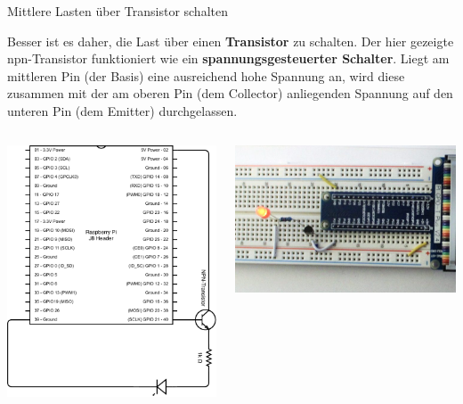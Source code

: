 {
\footnotesize

\begin{frame}{Mittlere Lasten über Transistor schalten}
    \parbox{\linewidth}{
        Besser ist es daher, die Last über einen \textbf{Transistor} zu schalten. Der hier
        gezeigte \glqq{}npn-Transistor\grqq{} funktioniert wie ein \textbf{spannungsgesteuerter
        Schalter}. Liegt am mittleren Pin (der \glqq{}Basis\grqq{}) eine ausreichend hohe
        Spannung an, wird diese zusammen mit der am oberen Pin (dem \glqq{}Collector\grqq{})
        anliegenden Spannung auf den unteren Pin (dem \glqq{}Emitter\grqq{}) durchgelassen.
    }

    \bigskip

    \begin{columns}
        \includegraphics[width=.8\textwidth]{2-hardwaredesign/img/led_transistor_schaltplan}

        \includegraphics[width=\textwidth]{2-hardwaredesign/img/led_transistor_foto}
    \end{columns}
\end{frame}
}

